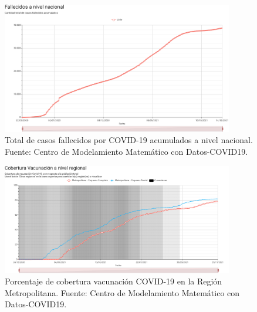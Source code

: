 \begin{figure}[H]
\centering
\includegraphics[width=0.9\textwidth]{img/metodologia/datos/fallecidos_nacional.png}
\caption{Total de casos fallecidos por COVID-19 acumulados a nivel nacional. Fuente: Centro de Modelamiento Matemático  con Datos-COVID19.}
\label{img:cmm-fallecidos}
\end{figure}

\begin{figure}[H]
\centering
\includegraphics[width=0.9\textwidth]{img/metodologia/datos/CoberturaVacunacionRM.png}
\caption{Porcentaje de cobertura vacunación COVID-19 en la Región Metropolitana. Fuente: Centro de Modelamiento Matemático con Datos-COVID19.}
\label{img:cmm-vacunados}
\end{figure}

